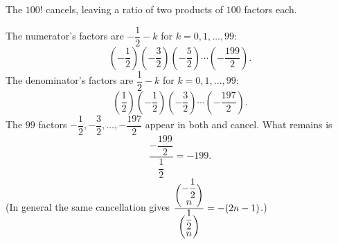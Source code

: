 The $100!$ cancels, leaving a ratio of two products of $100$ factors each.

The numerator's factors are $-\dfrac{1}{2}-k$ for $k=0,1,\dots,99$:
\[
\left(-\dfrac{1}{2}\right)\left(-\dfrac{3}{2}\right)\left(-\dfrac{5}{2}\right)\cdots\left(-\dfrac{199}{2}\right).
\]
The denominator's factors are $\dfrac{1}{2}-k$ for $k=0,1,\dots,99$:
\[
\left(\dfrac{1}{2}\right)\left(-\dfrac{1}{2}\right)\left(-\dfrac{3}{2}\right)\cdots\left(-\dfrac{197}{2}\right).
\]
The $99$ factors $-\dfrac{1}{2},-\dfrac{3}{2},\dots,-\dfrac{197}{2}$ appear in both and cancel. What remains is
\[
\dfrac{-\dfrac{199}{2}}{\dfrac{1}{2}}=\boxed{-199}.
\]
(In general the same cancellation gives $\dfrac{\dbinom{-\dfrac{1}{2}}{n}}{\dbinom{\dfrac{1}{2}}{n}}=-(2n-1)$.)
